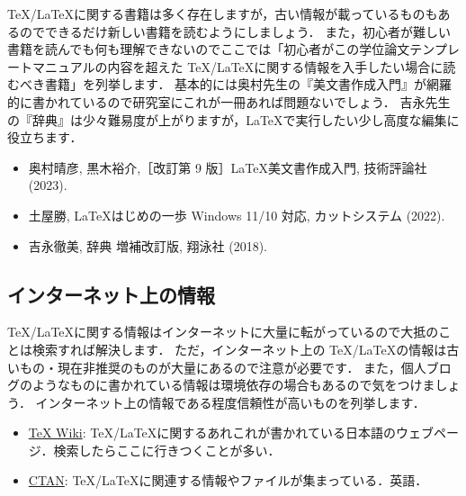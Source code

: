 \TeX/\LaTeX に関する書籍は多く存在しますが，古い情報が載っているものもあるのでできるだけ新しい書籍を読むようにしましょう．
また，初心者が難しい書籍を読んでも何も理解できないのでここでは「初心者がこの学位論文テンプレートマニュアルの内容を超えた \TeX/\LaTeX に関する情報を入手したい場合に読むべき書籍」を列挙します．
基本的には奥村先生の『美文書作成入門』が網羅的に書かれているので研究室にこれが一冊あれば問題ないでしょう．
吉永先生の『\LaTeXe 辞典』は少々難易度が上がりますが，\LaTeX で実行したい少し高度な編集に役立ちます．

\begin{itemize}
    \item 奥村晴彦, 黒木裕介,［改訂第 9 版］\LaTeX 美文書作成入門, 技術評論社 (2023).
    \item 土屋勝, \LaTeX はじめの一歩 Windows 11/10 対応, カットシステム (2022).
    \item 吉永徹美, \LaTeXe 辞典 増補改訂版, 翔泳社 (2018).
\end{itemize}

\subsection{インターネット上の情報}
\label{sec:internet}

\TeX/\LaTeX に関する情報はインターネットに大量に転がっているので大抵のことは検索すれば解決します．
ただ，インターネット上の \TeX/\LaTeX の情報は古いもの・現在非推奨のものが大量にあるので注意が必要です．
また，個人ブログのようなものに書かれている情報は環境依存の場合もあるので気をつけましょう．
インターネット上の情報である程度信頼性が高いものを列挙します．

\begin{itemize}
    \item \href{https://texwiki.texjp.org/}{\TeX{} Wiki}: \TeX/\LaTeX に関するあれこれが書かれている日本語のウェブページ．検索したらここに行きつくことが多い．
    \item \href{https://ctan.org/}{CTAN}: \TeX/\LaTeX に関連する情報やファイルが集まっている．英語．
\end{itemize}


